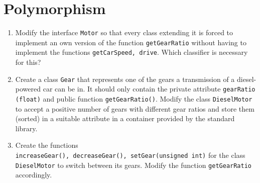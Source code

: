 \documentclass[12pt, a4paper]{article}
\begin{document}
\section*{Polymorphism}
\begin{enumerate}
    \item Modify the interface \lstinline{Motor} so that every class extending it is forced to implement an own version of the function \lstinline{getGearRatio} without having to implement the functions \lstinline{getCarSpeed, drive}. Which classifier is necessary for this?
    \item Create a class \lstinline{Gear} that represents one of the gears a transmission of a diesel-powered car can be in. It should only contain the private attribute \lstinline{gearRatio (float)} and public function \lstinline{getGearRatio()}. Modify the class \lstinline{DieselMotor} to accept a positive number of gears with different gear ratios and store them (sorted) in a suitable attribute in a container provided by the standard library.
    \item Create the functions \\ \lstinline{increaseGear(), decreaseGear(), setGear(unsigned int)} for the class \lstinline{DieselMotor} to switch between its gears. Modify the function \lstinline{getGearRatio} accordingly.
\end{enumerate}
\end{document}
